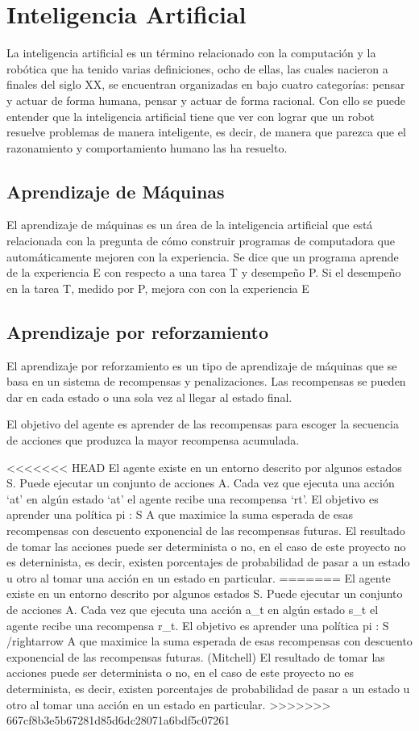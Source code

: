 \section{Inteligencia Artificial} \label{sect:Inteligencia_Artificial}
La inteligencia artificial es un término relacionado con la computación y la robótica que ha tenido varias definiciones, ocho de ellas, las cuales nacieron a finales del siglo XX, se encuentran organizadas en \cite{peterNorvig} bajo cuatro categorías: pensar y actuar de forma humana, pensar y actuar de forma racional. Con ello se puede entender que la inteligencia artificial tiene que ver con lograr que un robot resuelve problemas de manera inteligente, es decir, de manera que parezca que el razonamiento y comportamiento humano las ha resuelto.  

\subsection{ Aprendizaje de Máquinas}
El aprendizaje de máquinas es un área de la inteligencia artificial que está relacionada con la pregunta de cómo construir programas de computadora que automáticamente mejoren con la experiencia. Se dice que un programa aprende de la experiencia E con respecto a una tarea T y desempeño P. Si el desempeño en la tarea T, medido por P, mejora con con la experiencia E \cite{Mitchell}
\subsection{Aprendizaje por reforzamiento}
El aprendizaje por reforzamiento es un tipo de aprendizaje de máquinas que se basa en un sistema de recompensas y penalizaciones. Las recompensas se pueden dar en cada estado o una sola vez al llegar al estado final.

El objetivo del agente es aprender de las recompensas para escoger la secuencia de acciones que produzca la mayor recompensa acumulada. \cite{Mitchell}

<<<<<<< HEAD
El agente existe en un entorno descrito por algunos estados S. Puede ejecutar un conjunto de acciones A. Cada vez que ejecuta una acción ‘at’ en algún estado ‘at’ el agente recibe una recompensa ‘rt’. El objetivo es aprender una política pi : S \- A que maximice la suma esperada de esas recompensas con descuento exponencial de las recompensas futuras. \cite{Mitchell} El resultado de tomar las acciones puede ser determinista o no, en el caso de este proyecto no es deterninista, es decir, existen porcentajes de probabilidad de pasar a un estado u otro al tomar una acción en un estado en particular.  
=======
El agente existe en un entorno descrito por algunos estados S. Puede ejecutar un conjunto de acciones A. Cada vez que ejecuta una acción a_{t} en algún estado s_{t} el agente recibe una recompensa r_{t}. El objetivo es aprender una política pi : S /rightarrow A que maximice la suma esperada de esas recompensas con descuento exponencial de las recompensas futuras. (Mitchell) El resultado de tomar las acciones puede ser determinista o no, en el caso de este proyecto no es determinista, es decir, existen porcentajes de probabilidad de pasar a un estado u otro al tomar una acción en un estado en particular.  
>>>>>>> 667cf8b3e5b67281d85d6dc28071a6bdf5c07261

